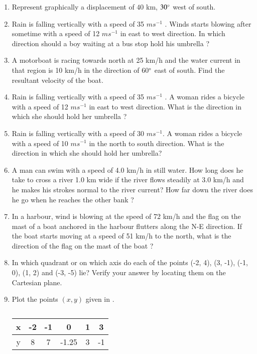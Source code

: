 \begin{enumerate}[label=\thesubsection.\arabic*, ref=\thesubsection.\theenumi]
\item Represent graphically a displacement of $40$ km,  $30\degree$ west of south.
	\item Rain is falling vertically with a speed of 35 $m s^{-1}$
. Winds starts blowing after sometime with a speed of 12 $m s^{-1}$ in
east to west direction. In which direction should a boy waiting at a bus stop hold his umbrella ?
%
\item A motorboat is racing towards north at 25 km/h and the water current in that region is 10 km/h in the direction of 60$\degree$ east of south. Find the resultant velocity of the boat.
\item Rain is falling vertically with a speed of 35 $m s^{-1}$
. A woman rides a bicycle with a speed of 12 $ms^{-1}$ in east to west
direction. What is the direction in which she should hold her umbrella ?
\item Rain is falling vertically with a speed of 30 $m s^{-1}$. A woman rides a bicycle with a speed  of 10 $m s^{-1}$ in the north to south direction. What is the direction in which she should
hold her umbrella?
\item A man can swim with a speed of 4.0 km/h in still water. How long does he take to cross a river 1.0 km wide if the river flows steadily at 3.0 km/h and he makes his strokes normal to the river current? How far down the river does he go when he reaches the other bank ?
\item In a harbour,  wind is blowing at the speed of 72 km/h and the flag on the mast of a boat anchored in the harbour flutters along the N-E direction. If the boat starts moving at a speed of 51 km/h to the north,  what is the direction of the flag on the mast of the boat ?
\item In which quadrant or on which axis do each of the points (-2, 4), (3, -1), (-1, 0), (1, 2) and (-3, -5) lie? Verify your answer by locating them on the Cartesian plane.
\item Plot the points $(x, y)$ given in 
.
\begin{table}[H]
	\centering
\begin{tabular}{|c|c|c|c|c|c|}
\hline	
x & -2 & -1 & 0 & 1 & 3\\
\hline
y & 8 & 7 & -1.25 & 3 & -1\\
\hline
\end{tabular}
\caption{}
\label{table:Table of values}
\end{table}
\end{enumerate}
